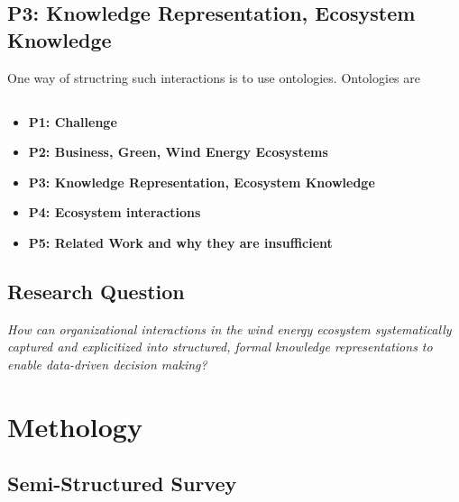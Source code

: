 \documentclass[runningheads]{llncs}
\begin{document}
\subsection{P3: Knowledge Representation, Ecosystem Knowledge}
One way of structring such interactions is to use ontologies. Ontologies are 

\subsection{}
\begin{itemize}
    \item \textbf{P1: Challenge}
    \item \textbf{P2: Business, Green, Wind Energy Ecosystems}
    \item \textbf{P3: Knowledge Representation, Ecosystem Knowledge}
    \item \textbf{P4: Ecosystem interactions}
    \item \textbf{P5: Related Work and why they are insufficient}
\end{itemize}

\subsection*{\textbf{Research Question}}
\begin{center}
    \textit{How can organizational interactions in the wind energy ecosystem 
systematically captured and explicitized into structured, formal knowledge representations to enable data-driven decision making?}
\end{center}

\section{Methology}

\subsection{Semi-Structured Survey}
\end{document}
